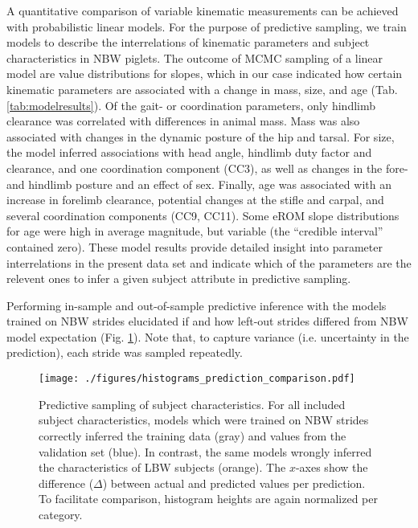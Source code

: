 A quantitative comparison of variable kinematic measurements can be achieved with probabilistic linear models.
For the purpose of predictive sampling, we train models to describe the interrelations of kinematic parameters and subject characteristics in NBW piglets.
The outcome of MCMC sampling of a linear model are value distributions for slopes, which in our case indicated how certain kinematic parameters are associated with a change in mass, size, and age (Tab. \ref{tab:modelresults}).
Of the gait- or coordination parameters, only hindlimb clearance was correlated with differences in animal mass.
Mass was also associated with changes in the dynamic posture of the hip and tarsal.
For size, the model inferred associations with head angle, hindlimb duty factor and clearance, and one coordination component (CC3), as well as changes in the fore- and hindlimb posture and an effect of sex.
Finally, age was associated with an increase in forelimb clearance, potential changes at the stifle and carpal, and several coordination components (CC9, CC11).
Some eROM slope distributions for age were high in average magnitude, but variable (the ``credible interval'' contained zero).
These model results provide detailed insight into parameter interrelations in the present data set and indicate which of the parameters are the relevent ones to infer a given subject attribute in predictive sampling.



\bigskip

Performing in-sample and out-of-sample predictive inference with the models trained on NBW strides elucidated if and how left-out strides differed from NBW model expectation (Fig. \ref{fig:predictions}).
Note that, to capture variance (i.e. uncertainty in the prediction), each stride was sampled repeatedly.

\begin{figure}[p]
\centering
\texttt{[image: ./figures/histograms\_prediction\_comparison.pdf]}
\caption{\label{fig:predictions}Predictive sampling of subject characteristics. For all included subject characteristics, models which were trained on NBW strides correctly inferred the training data (gray) and values from the validation set (blue). In contrast, the same models wrongly inferred the characteristics of LBW subjects (orange). The \(x\)-axes show the difference (\(\Delta\)) between actual and predicted values per prediction. To facilitate comparison, histogram heights are again normalized per category.}
\end{figure}


